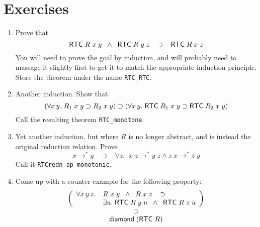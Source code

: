 \documentclass[12pt]{article}
\begin{document}
\section*{Exercises}

\begin{enumerate}
\item Prove that \[{\sf RTC}\;R \;x\; y \;\;\land \;\;
  {\sf RTC}\;R\;y\;z\;\;\;\supset\;\;\; {\sf RTC}\;R\;x\;z
\] You will need to prove the goal by induction, and will probably
  need to massage it slightly first to get it to match the appropriate
  induction principle.  Store the theorem under the name
  \texttt{RTC\_RTC}.
\item Another induction.  Show that \[
  (\forall x\,y.\; R_1\;x\;y\supset R_2\;x\;y) \supset
  (\forall x\,y.\; {\sf RTC}\;R_1\;x\;y \supset {\sf RTC}\;R_2\;x\;y)
\] Call the resulting theorem \texttt{RTC\_monotone}.
\item Yet another  induction, but where $R$ is no longer
  abstract, and is instead the original reduction relation.  Prove
\[
x \rightarrow^* y \;\;\;\supset\;\;\;
\forall z.\;\; x\;z \rightarrow^* y \;z \land
z\;x \rightarrow^* z\;y
\] Call it \texttt{RTCredn\_ap\_monotonic}.


\item Come up with a counter-example for the following property: \[
\begin{array}{c}
  \left(
    \begin{array}{ll}
      \forall x\,y\,z. &
      R\;x\;y\;\;\land\;\; R\;x\;z \;\;\;\supset\\
      & \exists u.\;{\sf RTC}\;R\;y\;u \;\;\land\;\;{\sf RTC}\;R\;z\;u
      \end{array}\right)\\
    \supset\\
    {\sf diamond}\;({\sf RTC}\;R)
  \end{array}
  \]
\end{enumerate}
\end{document}
